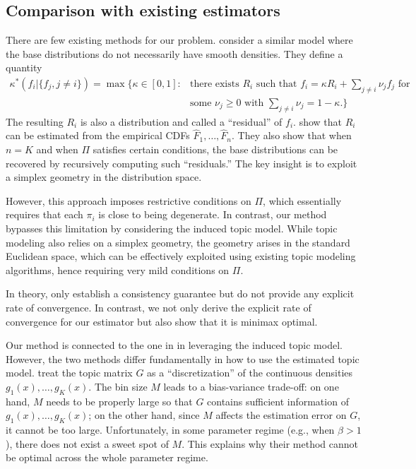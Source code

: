 \documentclass[preprint,11pt]{article}
\numberwithin{equation}{section}
\begin{document}
\subsection{Comparison with existing estimators} \label{subsec:comparison}
There are few existing methods for our problem. \cite{katz2019decontamination} consider a similar model where the base distributions do not necessarily have smooth densities. They define a quantity 
\[
\begin{array}{rl}
\kappa^*(f_i| \{f_j, j\neq i\})= \max\bigl\{\kappa\in [0,1]:  & \mbox{there exists $R_i$ such that $f_i=\kappa R_i + \sum_{j\neq i}\nu_j f_j$ for}\\
& \mbox{some $\nu_j\geq 0$ with $\sum_{j\neq i}\nu_j=1-\kappa$}.\bigr\}
\end{array}
\]
The resulting $R_i$ is also a distribution and called a ``residual'' of $f_i$. \cite{katz2019decontamination} show that $R_i$ can be estimated from the empirical CDFs $\hat{F}_1, \ldots, \hat{F}_n$. They also show that when $n=K$ and when $\Pi$ satisfies certain conditions, 
the base distributions can be recovered by recursively computing such ``residuals.'' 
The key insight is to exploit a simplex geometry in the distribution space. 

However, this approach imposes restrictive conditions on $\Pi$, which essentially requires that each $\pi_i$ is close to being degenerate. In contrast, our method bypasses this limitation by considering the induced topic model. While topic modeling also relies on a simplex geometry, the geometry arises in the standard Euclidean space, which can be effectively exploited using existing topic modeling algorithms, hence requiring very mild conditions on $\Pi$. 

In theory, \cite{katz2019decontamination} only establish a consistency guarantee but do not provide any explicit rate of convergence. In contrast, we not only derive the explicit rate of convergence for our estimator but also show that it is minimax optimal.  


Our method is connected to the one in \cite{austern2025poisson} in leveraging the induced topic model. 
However, the two methods differ fundamentally in how to use the estimated topic model. 
 \cite{austern2025poisson} treat the topic matrix $G$ as a ``discretization'' of the continuous densities $g_1(x), \ldots, g_K(x)$. 
 The bin size $M$ leads to a bias-variance trade-off: on one hand, $M$ needs to be properly large so that $G$ contains sufficient information of $g_1(x), \ldots, g_K(x)$; 
on the other hand, since $M$ affects the estimation error on $G$, it cannot be too large. 
Unfortunately, in some parameter regime (e.g., when $\beta>1$), there does not exist a sweet spot of $M$. This explains why their method cannot be optimal across the whole parameter regime.  
\end{document}
